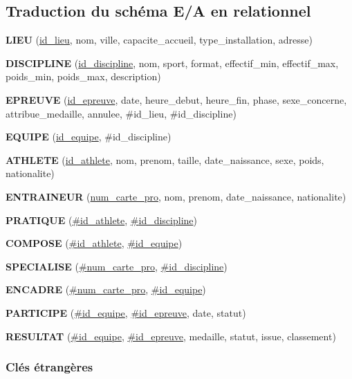 \subsection{Traduction du schéma E/A en relationnel}
\newcommand{\pk}[1]{\underline{#1}}
\newcommand{\fk}[1]{\#{#1}}
\newcommand{\pkfk}[1]{\underline{\#{#1}}}

\textbf{LIEU} (\pk{id\_lieu}, nom, ville, capacite\_accueil, type\_installation, adresse)

\textbf{DISCIPLINE} (\pk{id\_discipline}, nom, sport, format, effectif\_min, effectif\_max, poids\_min, poids\_max, description)

\textbf{EPREUVE} (\pk{id\_epreuve}, date, heure\_debut, heure\_fin, phase, sexe\_concerne, attribue\_medaille, annulee, \fk{id\_lieu}, \fk{id\_discipline})

\textbf{EQUIPE} (\pk{id\_equipe}, \fk{id\_discipline})

\textbf{ATHLETE} (\pk{id\_athlete}, nom, prenom, taille, date\_naissance, sexe, poids, nationalite)

\textbf{ENTRAINEUR} (\pk{num\_carte\_pro}, nom, prenom, date\_naissance, nationalite)

\textbf{PRATIQUE} (\pkfk{id\_athlete}, \pkfk{id\_discipline})

\textbf{COMPOSE} (\pkfk{id\_athlete}, \pkfk{id\_equipe})

\textbf{SPECIALISE} (\pkfk{num\_carte\_pro}, \pkfk{id\_discipline})

\textbf{ENCADRE} (\pkfk{num\_carte\_pro}, \pkfk{id\_equipe})

\textbf{PARTICIPE} (\pkfk{id\_equipe}, \pkfk{id\_epreuve}, date, statut)

\textbf{RESULTAT} (\pkfk{id\_equipe}, \pkfk{id\_epreuve}, medaille, statut, issue, classement)

\subsubsection*{Clés étrangères}

